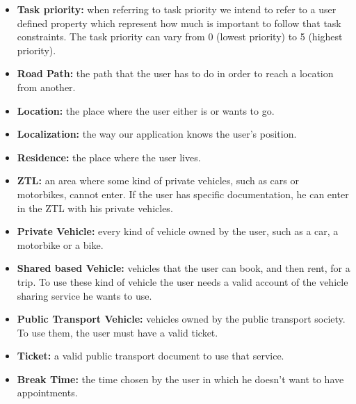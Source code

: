 \begin{itemize}
     \item \textbf{Task priority:} when referring to task priority we intend to refer to a user defined property which represent how much is important to follow that task constraints. The task priority can vary from 0 (lowest priority) to 5 (highest priority).
     
    \item \textbf{Road Path:} the path that the user has to do in order to reach a location from another.
    
    \item \textbf{Location:} the place where the user either is or wants to go.
    
    \item \textbf{Localization:} the way our application knows the user's position.
    
    \item \textbf{Residence:} the place where the user lives.
    
    \item \textbf{ZTL:} an area where some kind of private vehicles, such as cars or motorbikes, cannot enter. If the user has specific documentation, he can enter in the ZTL with his private vehicles.
    
    \item \textbf{Private Vehicle:} every kind of vehicle owned by the user, such as a car, a motorbike or a bike.
    
    \item \textbf{Shared based Vehicle:} vehicles that the user can book, and then rent, for a trip. To use these kind of vehicle the user needs a valid account of the vehicle sharing service he wants to use.
    
    \item \textbf{Public Transport Vehicle:} vehicles owned by the public transport society. To use them, the user must have a valid ticket.
        
    \item \textbf{Ticket:} a valid public transport document to use that service.
    
    \item \textbf{Break Time:} the time chosen by the user in which he doesn't want to have appointments.
    

\end{itemize}
